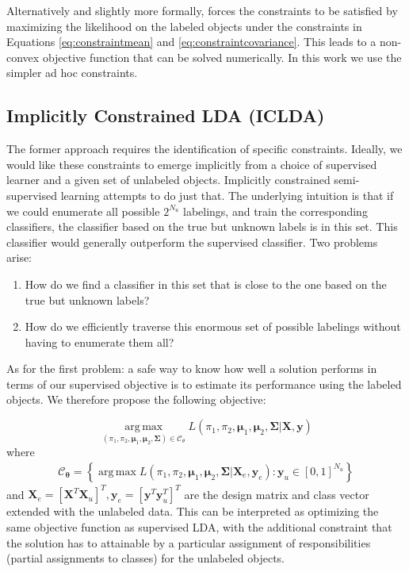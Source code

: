 Alternatively and slightly more formally, \cite{Loog2012b} forces the constraints to be satisfied by maximizing the likelihood on the labeled objects under the constraints in Equations \eqref{eq:constraintmean} and \eqref{eq:constraintcovariance}. This leads to a non-convex objective function that can be solved numerically. In this work we use the simpler ad hoc constraints.

\subsection{Implicitly Constrained LDA (ICLDA)}
The former approach requires the identification of specific constraints. Ideally, we would like these constraints to emerge implicitly from a choice of supervised learner and a given set of unlabeled objects. Implicitly constrained semi-supervised learning attempts to do just that. The underlying intuition is that if we could enumerate all possible $2^{N_u}$ labelings, and train the corresponding classifiers, the classifier based on the true but unknown labels is in this set. This classifier would generally outperform the supervised classifier. Two problems arise:

\begin{enumerate}
\item How do we find a classifier in this set that is close to the one based on the true but unknown labels?
\item How do we efficiently traverse this enormous set of possible labelings without having to enumerate them all?
\end{enumerate}
As for the first problem: a safe way to know how well a solution performs in terms of our supervised objective is to estimate its performance using the labeled objects. We therefore propose the following objective:

\begin{equation}
\label{eq:iclda}
\operatorname*{arg\,max}_{\left( \pi_1,\pi_2, \boldsymbol{\mu}_1,\boldsymbol{\mu}_2,\mathbf{\Sigma}\right) \in \mathcal{C}_\theta} L(\pi_1,\pi_2, \boldsymbol{\mu}_1,\boldsymbol{\mu}_2,\mathbf{\Sigma}|\mathbf{X},\mathbf{y})
\end{equation}
where
\begin{align}
\mathcal{C}_{\boldsymbol{\theta}} = \left\{ \operatorname*{arg\,max} L(\pi_1,\pi_2, \boldsymbol{\mu}_1,\boldsymbol{\mu}_2,\mathbf{\Sigma}| \mathbf{X}_e, \mathbf{y}_e) : \mathbf{y}_u \in [0,1]^{N_u} \right\} \nonumber
\end{align}
and $\mathbf{X}_e=[\mathbf{X}^T \mathbf{X}_u]^T, \mathbf{y}_e=[\mathbf{y}^T \mathbf{y}_u^T]^T$ are the design matrix and class vector extended with the unlabeled data. This can be interpreted as optimizing the same objective function as supervised LDA, with the additional constraint that the solution has to attainable by a particular assignment of responsibilities (partial assignments to classes) for the unlabeled objects.

